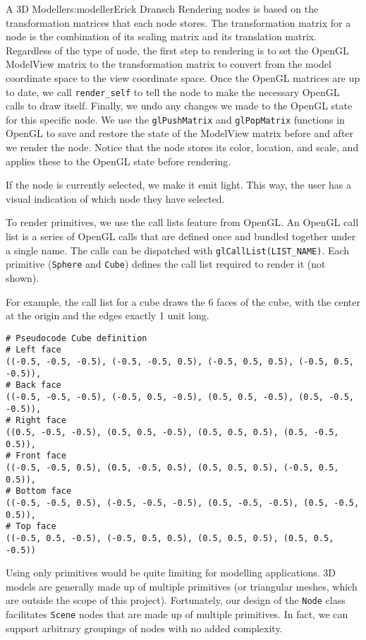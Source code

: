 \begin{aosachapter}{A 3D Modeller}{s:modeller}{Erick Dransch}
Rendering nodes is based on the transformation matrices that each node
stores. The transformation matrix for a node is the combination of its
scaling matrix and its translation matrix. Regardless of the type of
node, the first step to rendering is to set the OpenGL ModelView matrix
to the transformation matrix to convert from the model coordinate space
to the view coordinate space. Once the OpenGL matrices are up to date,
we call \texttt{render\_self} to tell the node to make the necessary
OpenGL calls to draw itself. Finally, we undo any changes we made to the
OpenGL state for this specific node. We use the \texttt{glPushMatrix}
and \texttt{glPopMatrix} functions in OpenGL to save and restore the
state of the ModelView matrix before and after we render the node.
Notice that the node stores its color, location, and scale, and applies
these to the OpenGL state before rendering.

If the node is currently selected, we make it emit light. This way, the
user has a visual indication of which node they have selected.

To render primitives, we use the call lists feature from OpenGL. An
OpenGL call list is a series of OpenGL calls that are defined once and
bundled together under a single name. The calls can be dispatched with
\texttt{glCallList(LIST\_NAME)}. Each primitive (\texttt{Sphere} and
\texttt{Cube}) defines the call list required to render it (not shown).

For example, the call list for a cube draws the 6 faces of the cube,
with the center at the origin and the edges exactly 1 unit long.

\begin{verbatim}
# Pseudocode Cube definition
# Left face
((-0.5, -0.5, -0.5), (-0.5, -0.5, 0.5), (-0.5, 0.5, 0.5), (-0.5, 0.5, -0.5)),
# Back face
((-0.5, -0.5, -0.5), (-0.5, 0.5, -0.5), (0.5, 0.5, -0.5), (0.5, -0.5, -0.5)),
# Right face
((0.5, -0.5, -0.5), (0.5, 0.5, -0.5), (0.5, 0.5, 0.5), (0.5, -0.5, 0.5)),
# Front face
((-0.5, -0.5, 0.5), (0.5, -0.5, 0.5), (0.5, 0.5, 0.5), (-0.5, 0.5, 0.5)),
# Bottom face
((-0.5, -0.5, 0.5), (-0.5, -0.5, -0.5), (0.5, -0.5, -0.5), (0.5, -0.5, 0.5)),
# Top face
((-0.5, 0.5, -0.5), (-0.5, 0.5, 0.5), (0.5, 0.5, 0.5), (0.5, 0.5, -0.5))
\end{verbatim}

Using only primitives would be quite limiting for modelling
applications. 3D models are generally made up of multiple primitives (or
triangular meshes, which are outside the scope of this project).
Fortunately, our design of the \texttt{Node} class facilitates
\texttt{Scene} nodes that are made up of multiple primitives. In fact,
we can support arbitrary groupings of nodes with no added complexity.


\end{aosachapter}

